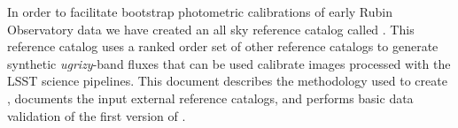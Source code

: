 In order to facilitate bootstrap photometric calibrations of early Rubin Observatory data we have created an all sky reference catalog called \monster. 
This reference catalog uses a ranked order set of other reference catalogs to generate synthetic \textit{ugrizy}-band fluxes that can be used calibrate images processed with the LSST science pipelines. 
This document describes the methodology used to create \monster, documents the input external reference catalogs, and performs basic data validation of the first version of \monster.